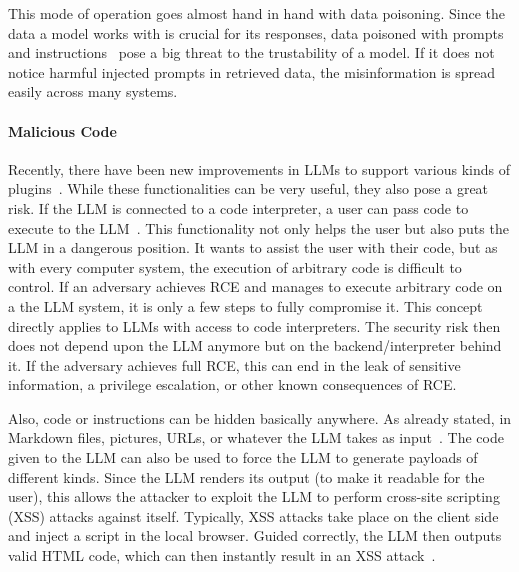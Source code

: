 This mode of operation goes almost hand in hand with data poisoning. 
Since the data a model works with is crucial for its responses, data poisoned with prompts and instructions~\cite{10.1145/3605764.3623985} pose a big threat to the trustability of a model. 
If it does not notice harmful injected prompts in retrieved data, the misinformation is spread easily across many systems. 

\paragraph{Malicious Code}
Recently, there have been new improvements in LLMs to support various kinds of plugins~\cite{plugins}.
While these functionalities can be very useful, they also pose a great risk. 
If the LLM is connected to a code interpreter, a user can pass code to execute to the LLM~\cite{liu2023demystifying}. 
This functionality not only helps the user but also puts the LLM in a dangerous position. 
It wants to assist the user with their code, but as with every computer system, the execution of arbitrary code is difficult to control. 
If an adversary achieves RCE and manages to execute arbitrary code on a the LLM system, it is only a few steps to fully compromise it.
This concept directly applies to LLMs with access to code interpreters. 
The security risk then does not depend upon the LLM anymore but on the backend/interpreter behind it. 
If the adversary achieves full RCE, this can end in the leak of sensitive information, a privilege escalation, or other known consequences of RCE.

Also, code or instructions can be hidden basically anywhere. 
As already stated, in Markdown files, pictures, URLs, or whatever the LLM takes as input~\cite{10.1145/3605764.3623985}.
The code given to the LLM can also be used to force the LLM to generate payloads of different kinds. 
Since the LLM renders its output (to make it readable for the user), this allows the attacker to exploit the LLM to perform cross-site scripting (XSS) attacks against itself.
Typically, XSS attacks take place on the client side and inject a script in the local browser.
Guided correctly, the LLM then outputs valid HTML code, which can then instantly result in an XSS attack~\cite{XSS, InsecureOutputHandling}.

